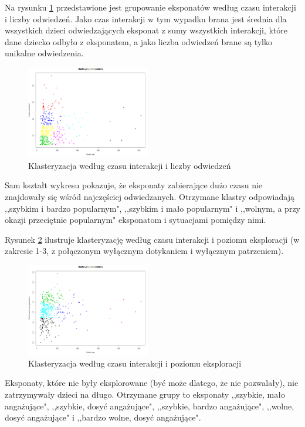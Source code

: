 \documentclass[conference]{IEEEtran}
\begin{document}
Na rysunku \ref{klasteryzacja_czas_odw} przedstawione jest grupowanie eksponatów według czasu interakcji i liczby odwiedzeń. Jako czas interakcji w tym wypadku brana jest średnia dla wszystkich dzieci odwiedzających eksponat z sumy wszystkich interakcji, które dane dziecko odbyło z eksponatem, a jako liczba odwiedzeń brane są tylko unikalne odwiedzenia.
\begin{figure}[H]
\includegraphics[width=0.48\textwidth]{klasteryzacja_czas_odw.png}
\caption{Klasteryzacja według czasu interakcji i liczby odwiedzeń}
\label{klasteryzacja_czas_odw}
\end{figure}
Sam kształt wykresu pokazuje, że eksponaty zabierające dużo czasu nie znajdowały się wśród najczęściej odwiedzanych. Otrzymane klastry odpowiadają ,,szybkim i bardzo popularnym", ,,szybkim i mało popularnym" i ,,wolnym, a przy okazji przeciętnie popularnym" eksponatom i sytuacjami pomiędzy nimi.

Rysunek \ref{klasteryzacja_czas_zach} ilustruje klasteryzację według czasu interakcji i poziomu eksploracji (w zakresie 1-3, z połączonym wyłącznym dotykaniem i wyłącznym patrzeniem).
\begin{figure}[H]
\includegraphics[width=0.48\textwidth]{klasteryzacja_czas_zach.png}
\caption{Klasteryzacja według czasu interakcji i poziomu eksploracji}
\label{klasteryzacja_czas_zach}
\end{figure}
Eksponaty, które nie były eksplorowane (być może dlatego, że nie pozwalały), nie zatrzymywały dzieci na długo. Otrzymane grupy to eksponaty ,,szybkie, mało angażujące", ,,szybkie, dosyć angażujące", ,,szybkie, bardzo angażujące", ,,wolne, dosyć angażujące" i ,,bardzo wolne, dosyć angażujące".
\end{document}
